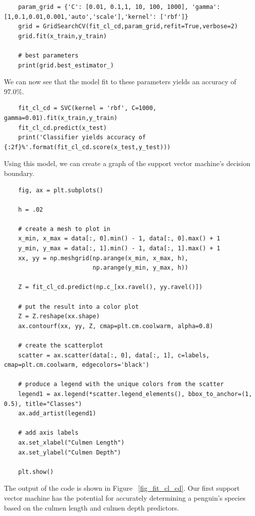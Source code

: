 \documentclass[12pt]{article}
\begin{document}
\begin{verbatim}
    param_grid = {'C': [0.01, 0.1,1, 10, 100, 1000], 'gamma': [1,0.1,0.01,0.001,'auto','scale'],'kernel': ['rbf']}
    grid = GridSearchCV(fit_cl_cd,param_grid,refit=True,verbose=2)
    grid.fit(x_train,y_train)

    # best parameters
    print(grid.best_estimator_)
\end{verbatim}

We can now see that the model fit to these parameters yields an accuracy of 97.0\%.

\begin{verbatim}
    fit_cl_cd = SVC(kernel = 'rbf', C=1000, gamma=0.01).fit(x_train,y_train)
    fit_cl_cd.predict(x_test)
    print('Classifier yields accuracy of {:2f}%'.format(fit_cl_cd.score(x_test,y_test)))
\end{verbatim}

Using this model, we can create a graph of the support vector machine's decision boundary.

\begin{verbatim}
    fig, ax = plt.subplots()

    h = .02
    
    # create a mesh to plot in
    x_min, x_max = data[:, 0].min() - 1, data[:, 0].max() + 1
    y_min, y_max = data[:, 1].min() - 1, data[:, 1].max() + 1
    xx, yy = np.meshgrid(np.arange(x_min, x_max, h),
                         np.arange(y_min, y_max, h))
    
    Z = fit_cl_cd.predict(np.c_[xx.ravel(), yy.ravel()])
    
    # put the result into a color plot
    Z = Z.reshape(xx.shape)
    ax.contourf(xx, yy, Z, cmap=plt.cm.coolwarm, alpha=0.8)
    
    # create the scatterplot
    scatter = ax.scatter(data[:, 0], data[:, 1], c=labels, cmap=plt.cm.coolwarm, edgecolors='black')
    
    # produce a legend with the unique colors from the scatter
    legend1 = ax.legend(*scatter.legend_elements(), bbox_to_anchor=(1, 0.5), title="Classes")
    ax.add_artist(legend1)
    
    # add axis labels
    ax.set_xlabel("Culmen Length")
    ax.set_ylabel("Culmen Depth")
    
    plt.show()    
\end{verbatim}

The output of the code is shown in Figure ~\ref{fig_fit_cl_cd}. Our first support vector machine has the potential for accurately determining a penguin's species based on the culmen length and culmen depth predictors.
\end{document}
